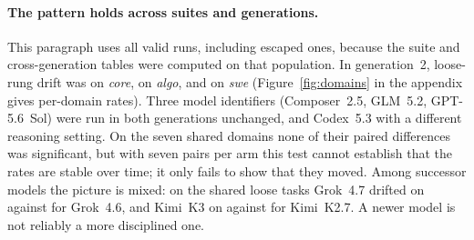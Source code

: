 \paragraph{The pattern holds across suites and generations.}
This paragraph uses all valid runs, including escaped ones, because the
suite and cross-generation tables were computed on that population. In
generation~2, loose-rung drift was \SuiteGtwoCoreDriftPct{} on \emph{core},
\SuiteGtwoAlgoDriftPct{} on \emph{algo}, and \SuiteGtwoSweDriftPct{} on
\emph{swe} (Figure~\ref{fig:domains} in the appendix gives per-domain rates).
Three model identifiers (Composer~2.5, GLM~5.2, GPT-5.6~Sol) were run in both
generations unchanged, and Codex~5.3 with a different reasoning setting. On
the seven shared domains none of their paired differences was significant,
but with seven pairs per arm this test cannot establish that the rates are
stable over time; it only fails to show that they moved. Among successor
models the picture is mixed: on the shared loose tasks Grok~4.7 drifted on
\CrossGrokNewLooseFrac{} against \CrossGrokOldLooseFrac{} for Grok~4.6, and
Kimi~K3 on \CrossKimiNewLooseFrac{} against \CrossKimiOldLooseFrac{} for
Kimi~K2.7. A newer model is not reliably a more disciplined one.

\FloatBarrier
